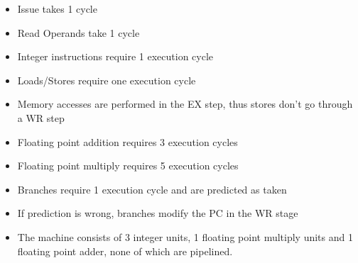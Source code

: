 \documentclass{article}
\begin{document}
\begin{itemize}
		\item Issue takes 1 cycle
\item Read Operands take 1 cycle
\item Integer instructions require 1 execution cycle
\item Loads/Stores require one execution cycle
\item Memory accesses are performed in the EX step, thus stores don't go through a WR step
\item Floating point addition requires 3 execution cycles
\item Floating point multiply requires 5 execution cycles
\item Branches require 1 execution cycle and are predicted as taken
\item If prediction is wrong, branches modify the PC in the WR stage
\item The machine consists of 3 integer units, 1 floating point multiply units and 1 floating point adder, none of which are pipelined.
\end{itemize}
\end{document}
